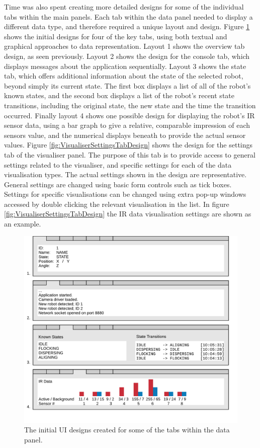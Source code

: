 Time was also spent creating more detailed designs for some of the individual tabs within the main panels. Each tab within the data panel needed to display a different data type, and therefore required a unique layout and design. Figure \ref{fig:DataPanelDesigns} shows the initial designs for four of the key tabs, using both textual and graphical approaches to data representation. Layout 1 shows the overview tab design, as seen previously. Layout 2 shows the design for the console tab, which displays messages about the application sequentially. Layout 3 shows the state tab, which offers additional information about the state of the selected robot, beyond simply its current state. The first box displays a list of all of the robot's known states, and the second box displays a list of the robot's recent state transitions, including the original state, the new state and the time the transition occurred. Finally layout 4 shows one possible design for displaying the robot's IR sensor data, using a bar graph to give a relative, comparable impression of each sensors value, and the numerical displays beneath to provide the actual sensor values. Figure \ref{fig:VisualiserSettingsTabDesign} shows the design for the settings tab of the visualiser panel. The purpose of this tab is to provide access to general settings related to the visualiser, and specific settings for each of the data visualisation types. The actual settings shown in the design are representative. General settings are changed using basic form controls such as tick boxes. Settings for specific visualisations can be changed using extra pop-up windows accessed by double clicking the relevant visualisation in the list. In figure \ref{fig:VisualiserSettingsTabDesign} the IR data visualisation settings are shown as an example.

\begin{figure}
	\centering
	\includegraphics[scale=1]{Figures/DataPanelDesigns.png}
	\decoRule
	\caption[Data Panel Designs]{The initial UI designs created for some of the tabs within the data panel.}
	\label{fig:DataPanelDesigns}
\end{figure}


